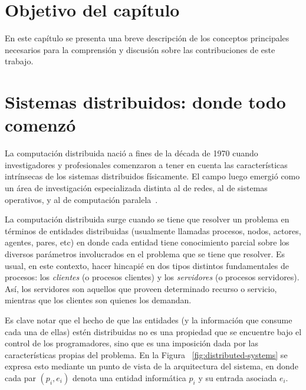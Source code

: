 \section{Objetivo del capítulo}\label{sec:prelim}


En este capítulo se presenta una breve descripción de los conceptos principales
necesarios para la comprensión y discusión sobre las
contribuciones de este trabajo.

\section{Sistemas distribuidos: donde todo comenzó}

La computación distribuida nació a fines de la década de 1970 cuando investigadores y profesionales
comenzaron a tener en cuenta las características intrínsecas de los sistemas distribuidos físicamente.
El campo luego emergió como un área de investigación especializada distinta al de redes, al de sistemas
operativos, y al de computación paralela~\cite{raynal.dist.systems}.

La computación distribuida surge cuando se tiene que resolver un problema en términos de entidades
distribuidas (usualmente llamadas procesos, nodos, actores, agentes, pares, etc) en donde cada
entidad tiene conocimiento parcial sobre los diversos parámetros involucrados en el problema que
se tiene que resolver.
Es usual, en este contexto, hacer hincapié en dos tipos distintos fundamentales de procesos:
los \textit{clientes} (o procesos clientes) y los \textit{servidores} (o procesos servidores).
Así, los servidores son aquellos que proveen determinado recurso o servicio, mientras que los
clientes son quienes los demandan.

Es clave notar que el hecho de que las entidades (y la información que consume cada una de ellas)
estén distribuidas no es una propiedad que se encuentre bajo el control de los programadores, sino 
que es una imposición dada por las características propias del problema. En la 
Figura ~\ref{fig:distributed-systems} se expresa esto mediante un punto de vista
de la arquitectura del sistema, en donde cada par $(p_i, e_i)$ denota una entidad informática $p_i$ y su
entrada asociada $e_i$.


